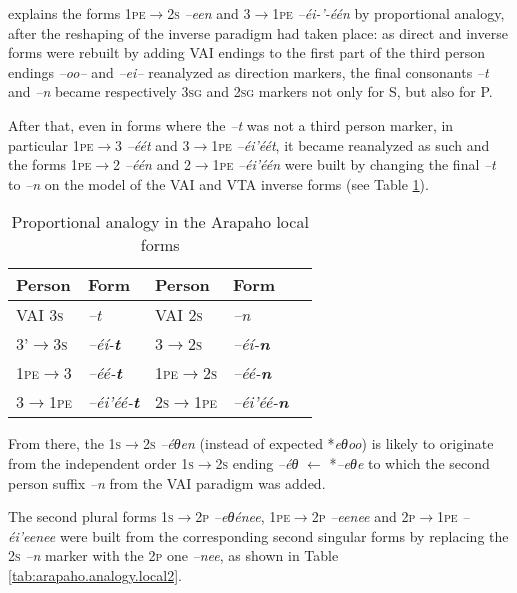 \documentclass[twoside,a4paper,11pt]{article}
\newcommand{\ipa}[1]{{\phon\textit{#1}}}
\newcommand{\grise}[1]{\cellcolor{lightgray}\textbf{#1}}
\newcommand{\Σ}{\greek{Σ}}
\begin{document}
\citet[23]{goddard65arapaho} explains the forms \textsc{1pe$\rightarrow$2s} \ipa{--een} and \textsc{3$\rightarrow$1pe} \ipa{--éi-'-één} by proportional analogy, after the reshaping of the inverse paradigm had taken place: as direct and inverse forms were rebuilt by adding VAI endings to the first part of the third person endings \ipa{--oo--} and \ipa{--ei--} reanalyzed as direction markers, the final consonants \ipa{--t} and \ipa{--n} became   respectively \textsc{3sg} and \textsc{2sg} markers not only for  S, but also for P.

After that, even in forms where the \ipa{--t} was not a third person marker, in particular  \textsc{1pe$\rightarrow$3}   \ipa{--éét} and   \textsc{3$\rightarrow$1pe}   \ipa{--éi'éét}, it became reanalyzed as such and the forms  \textsc{1pe$\rightarrow$2}   \ipa{--één} and   \textsc{2$\rightarrow$1pe}   \ipa{--éi'één} were built by changing the final \ipa{--t} to \ipa{--n} on the model of the VAI and VTA inverse forms (see Table  \ref{tab:arapaho.analogy.local}).

\begin{table}[H]
\caption{Proportional analogy in the Arapaho local forms}
\centering \label{tab:arapaho.analogy.local}
\begin{tabular}{lllll}
\toprule
 Person &  Form &  Person &  Form\\
\midrule 
 VAI \textsc{3s} & \ipa{--t} &  VAI \textsc{2s} & \ipa{--n} \\
  \textsc{3'$\rightarrow$3s} & \ipa{--éí-\textbf{t}} &   \textsc{3$\rightarrow$2s} & \ipa{--éí-\textbf{n}} \\
  \midrule 
    \textsc{1pe$\rightarrow$3} & \ipa{--éé-\textbf{t}} &  \textsc{1pe$\rightarrow$2s} &  \grise{}\ipa{--éé-\textbf{n}} \\
  \textsc{3$\rightarrow$1pe} & \ipa{--éi'éé-\textbf{t}} &  \textsc{2s$\rightarrow$1pe} &  \grise{}\ipa{--éi'éé-\textbf{n}} \\
\bottomrule
\end{tabular}
\end{table}

From there, the \textsc{1s$\rightarrow$2s}  \ipa{--éθen} (instead of expected *\ipa{eθoo}) is likely to originate from the independent order \textsc{1s$\rightarrow$2s} ending \ipa{--éθ} $\leftarrow$ *\ipa{--eθe} to which the second person suffix \ipa{--n} from the VAI paradigm was added. 

The second plural forms \textsc{1s$\rightarrow$2p} \ipa{--eθénee}, \textsc{1pe$\rightarrow$2p} \ipa{--eenee}  and \textsc{2p$\rightarrow$1pe} \ipa{--éi'eenee} were built from the corresponding second singular forms by replacing the \textsc{2s}  \ipa{--n} marker with the \textsc{2p} one \ipa{--nee}, as shown in Table \ref{tab:arapaho.analogy.local2}.
 
\end{document}
